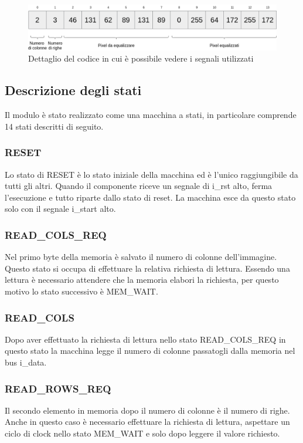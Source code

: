 \documentclass{article}
\begin{document}
\begin{figure}[h]
    \includegraphics[width=\textwidth]{memory.png}
    \centering
    \caption{Dettaglio del codice in cui è possibile vedere i segnali utilizzati}
\end{figure}

\pagebreak
\subsection{Descrizione degli stati}
Il modulo è stato realizzato come una macchina a stati, in particolare comprende 14 stati descritti di seguito.

\subsubsection{RESET}
Lo stato di RESET è lo stato iniziale della macchina ed è l'unico raggiungibile da tutti gli altri. Quando il componente riceve un segnale di i\_rst alto, ferma l'esecuzione e tutto riparte dallo stato di reset. La macchina esce da questo stato solo con il segnale i\_start alto.

\subsubsection{READ\_COLS\_REQ}
Nel primo byte della memoria è salvato il numero di colonne dell'immagine. Questo stato si occupa di effettuare la relativa richiesta di lettura. Essendo una lettura è necessario attendere che la memoria elabori la richiesta, per questo motivo lo stato successivo è MEM\_WAIT.

\subsubsection{READ\_COLS}
Dopo aver effettuato la richiesta di lettura nello stato READ\_COLS\_REQ in questo stato la macchina legge il numero di colonne passatogli dalla memoria nel bus i\_data.

\subsubsection{READ\_ROWS\_REQ}
Il secondo elemento in memoria dopo il numero di colonne è il numero di righe. Anche in questo caso è necessario effettuare la richiesta di lettura, aspettare un ciclo di clock nello stato MEM\_WAIT e solo dopo leggere il valore richiesto.
\end{document}
